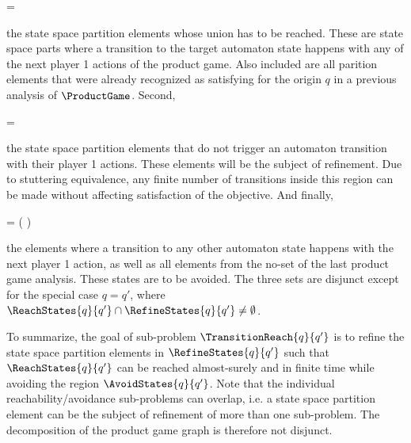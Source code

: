     \startformula
         =  \EndComma
    \stopformula

    the state space partition elements whose union has to be reached.
    These are state space parts where a transition to the target automaton state happens with any of the next player 1 actions of the product game.
    Also included are all parition elements that were already recognized as satisfying for the origin $q$ in a previous analysis of $\ProductGame$.
    Second,

    \startformula
         =  \EndComma
    \stopformula

    the state space partition elements that do not trigger an automaton transition with their player 1 actions.
    These elements will be the subject of refinement.
    Due to stuttering equivalence, any finite number of transitions inside this region can be made without affecting satisfaction of the objective.
    And finally,

    \startformula
         =  \setminus \left(  \cup {} \right) \EndComma
    \stopformula

    the elements where a transition to any other automaton state happens with the next player 1 action, as well as all elements from the no-set of the last product game analysis.
    These states are to be avoided.
    The three sets are disjunct except for the special case $q = q'$, where $\ReachStates{q}{q'} \cap \RefineStates{q}{q'} \ne \emptyset$.

    To summarize, the goal of sub-problem $\TransitionReach{q}{q'}$ is to refine the state space partition elements in $\RefineStates{q}{q'}$ such that $\ReachStates{q}{q'}$ can be reached almost-surely and in finite time while avoiding the region $\AvoidStates{q}{q'}$.
    Note that the individual reachability/avoidance sub-problems can overlap, i.e. a state space partition element can be the subject of refinement of more than one sub-problem.
    The decomposition of the product game graph is therefore not disjunct.

\stopsubsection


